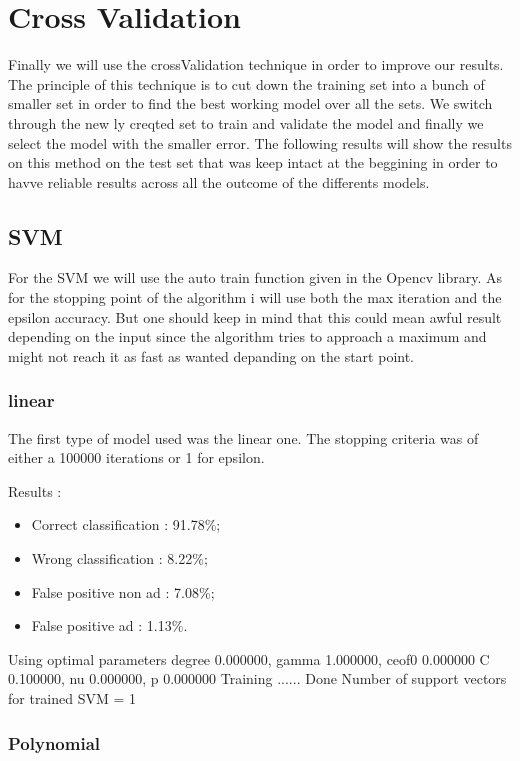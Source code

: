 \section{Cross Validation}

Finally we will use the crossValidation technique in order to improve our results. The principle of this technique is to cut down the training set into a bunch of smaller set in order to find the best working model over all the sets. We switch through the new ly creqted set to train and validate the model and finally we select the model with the smaller error. The following results will show the results on this method on the test set that was keep intact at the beggining in order to havve reliable results across all the outcome of the differents models.

\subsection{SVM}

For the SVM we will use the auto train function given in the Opencv library. As for the stopping point of the algorithm i will use both the max iteration and the epsilon accuracy. But one should keep in mind that this could mean awful result depending on the input since the algorithm tries to approach a maximum and might not reach it as fast as wanted depanding on the start point.

\subsubsection{linear}

The first type of model used was the linear one. The stopping criteria was of either a 100000 iterations or 1 for epsilon.

Results :
\begin{itemize}
  \item Correct classification : 91.78\%;
  \item Wrong classification : 8.22\%;
  \item False positive non ad : 7.08\%;
  \item False positive ad : 1.13\%.
\end{itemize}

Using optimal parameters degree 0.000000, gamma 1.000000, ceof0 0.000000
	 C 0.100000, nu 0.000000, p 0.000000
 Training ...... Done
Number of support vectors for trained SVM = 1

\subsubsection{Polynomial}

